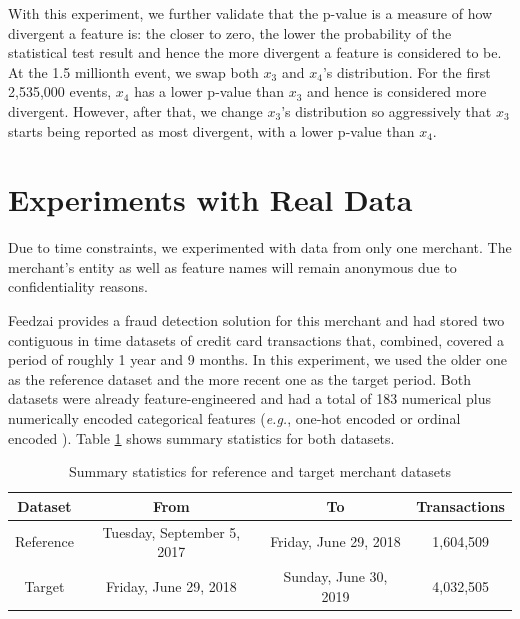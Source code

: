 With this experiment, we further validate that the p-value is a measure of how divergent a feature is: the closer to zero, the lower the probability of the statistical test result and hence the more divergent a feature is considered to be. At the 1.5 millionth event, we swap both $x_3$ and $x_4$'s distribution. For the first 2,535,000 events, $x_4$ has a lower p-value than $x_3$ and hence is considered more divergent. However, after that, we change $x_3$'s distribution so aggressively that $x_3$ starts being reported as most divergent, with a lower p-value than $x_4$.

\clearpage
\section{Experiments with Real Data}

Due to time constraints, we experimented with data from only one merchant. The merchant's entity as well as feature names will remain anonymous due to confidentiality reasons.

Feedzai provides a fraud detection solution for this merchant and had stored two contiguous in time datasets of credit card transactions that, combined, covered a period of roughly 1 year and 9 months. In this experiment, we used the older one as the reference dataset and the more recent one as the target period. Both datasets were already feature-engineered \cite{Domingos-ML-Feat-Eng} and had a total of 183 numerical plus numerically encoded categorical features (\textit{e.g.}, one-hot encoded or ordinal encoded \cite{categoricalencoding}). Table \ref{tbl:merchant1-datasets-summary} shows summary statistics for both datasets.
\begin{table}[!htb]
    \begin{center}
        \begin{tabular}{|c|c|c|c|}
        \hline
        \textbf{Dataset} & \textbf{From}              & \textbf{To}           & \multicolumn{1}{l|}{\textbf{Transactions}} \\ \hline
        Reference        & Tuesday, September 5, 2017 & Friday, June 29, 2018 & 1,604,509                                  \\ \hline
        Target           & Friday, June 29, 2018      & Sunday, June 30, 2019 & 4,032,505                                  \\ \hline
        \end{tabular}
        \caption{Summary statistics for reference and target merchant datasets}
        \label{tbl:merchant1-datasets-summary}
    \end{center}
\end{table}

